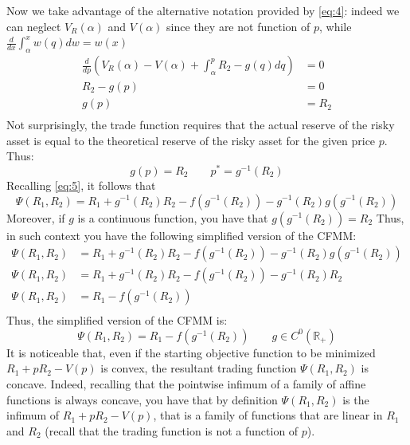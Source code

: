 \documentclass[12pt]{article}
\begin{document}
Now we take advantage of the alternative notation provided by \eqref{eq:4}: indeed we can neglect $V_R(\alpha)$ and $V(\alpha)$ since they are not function of $p$, while $\frac{d}{dx}\int_{\alpha}^x w(q) dw = w(x)$
\begin{align*}
    \frac{d}{dp} \left(V_R(\alpha) -V(\alpha) + \int_{\alpha}^p R_2 -g(q) dq  \right) & = 0  \\
    R_2 -g(p)                                                                         & =0   \\
    g(p)                                                                              & =R_2 \\
\end{align*}
Not surprisingly, the trade function requires that the actual reserve of the risky asset is equal to the theoretical reserve of the risky asset for the given price $p$. \newline
Thus:
\begin{equation}
    g(p)=R_2 \qquad p^* = g^{-1}(R_2) \label{eq:6}
\end{equation}
Recalling \eqref{eq:5}, it follows that
\begin{equation}
    \Psi(R_1,R_2) = R_1 + g^{-1}(R_2)R_2 - f(g^{-1}(R_2)) - g^{-1}(R_2)g(g^{-1}(R_2)) \label{eq:7}
\end{equation}
Moreover, if $g$ is a continuous function, you have that $g(g^{-1}(R_2))=R_2$
Thus, in such context you have the following simplified version of the CFMM:
\begin{align*}
    \Psi(R_1,R_2) & = R_1 + g^{-1}(R_2)R_2 - f(g^{-1}(R_2)) - g^{-1}(R_2)g(g^{-1}(R_2)) \\
    \Psi(R_1,R_2) & = R_1 + g^{-1}(R_2)R_2 - f(g^{-1}(R_2)) - g^{-1}(R_2)R_2            \\
    \Psi(R_1,R_2) & = R_1 - f(g^{-1}(R_2))                                              \\
\end{align*}
Thus, the simplified version of the CFMM is:
\begin{equation}
    \Psi(R_1,R_2) = R_1 - f(g^{-1}(R_2)) \qquad g\in C^0(\mathbb{R_+}) \label{eq:8}
\end{equation}
It is noticeable that, even if the starting objective function to be minimized $R_1 +pR_2 -V(p)$ is convex, the resultant trading function $\Psi(R_1,R_2)$ is concave. \newline
Indeed, recalling that the pointwise infimum of a family of affine functions is always concave, you have that
by definition $\Psi(R_1,R_2)$ is the infimum of $R_1 +pR_2 -V(p)$, that is a family of functions that are linear in $R_1$ and $R_2$ (recall that the trading function is not a function of $p$).
\end{document}
